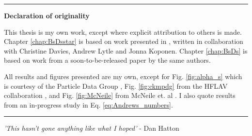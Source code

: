 \begin{titlepage}
\begin{vcenterpage}
\noindent\rule[2pt]{\textwidth}{0.5pt}
\begin{center}
{\large\textbf{Declaration of originality}}
\end{center}
This thesis is my own work, except where explicit attribution to others is made. Chapter \ref{chap:BsDsstar} is based on work presented in \cite{McLean:2019sds}, written in collaboration with Christine Davies, Andrew Lytle and Jonna Koponen. Chapter \ref{chap:BsDs} is based on work from a soon-to-be-released paper by the same authors.

All results and figures presented are my own, except for Fig. \ref{fig:alpha_s} which is courtesy of the Particle Data Group \cite{PhysRevD.98.030001}, Fig. \ref{fig:ckmpdg} from the HFLAV collaboration \cite{HFLAV16}, and Fig. \ref{fig:McNeile} from McNeile et. al \cite{McNeile:2012qf}. I also quote results from an in-progress study \cite{Colquhoun:2016osw} in Eq. \eqref{eq:Andrews_numbers}.
    
\noindent\rule[2pt]{\textwidth}{0.5pt}
\end{vcenterpage}

\cleardoublepage

\thispagestyle{empty}

\begin{center}
  \emph{'This hasn't gone anything like what I hoped'} - Dan Hatton
\end{center}


\end{titlepage}
\sloppy

\titlepage
